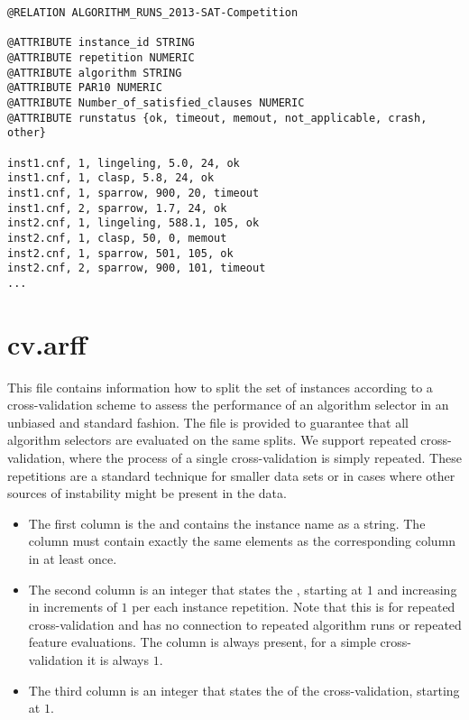 \begin{lstlisting}[caption=Example algorithm\_runs.arff with four algorithms]
@RELATION ALGORITHM_RUNS_2013-SAT-Competition

@ATTRIBUTE instance_id STRING
@ATTRIBUTE repetition NUMERIC
@ATTRIBUTE algorithm STRING
@ATTRIBUTE PAR10 NUMERIC
@ATTRIBUTE Number_of_satisfied_clauses NUMERIC
@ATTRIBUTE runstatus {ok, timeout, memout, not_applicable, crash, other}

inst1.cnf, 1, lingeling, 5.0, 24, ok
inst1.cnf, 1, clasp, 5.8, 24, ok
inst1.cnf, 1, sparrow, 900, 20, timeout
inst1.cnf, 2, sparrow, 1.7, 24, ok
inst2.cnf, 1, lingeling, 588.1, 105, ok
inst2.cnf, 1, clasp, 50, 0, memout
inst2.cnf, 1, sparrow, 501, 105, ok
inst2.cnf, 2, sparrow, 900, 101, timeout
...
\end{lstlisting}


\section{cv.arff}

This file contains information how to split the set of instances according to a cross-validation
scheme to assess the performance of an algorithm selector in an unbiased and standard fashion.
The file is provided to guarantee that all algorithm selectors are evaluated on the same splits.
We support repeated cross-validation, where the process of a single cross-validation is simply 
repeated. These repetitions are a standard technique for smaller data sets or in cases 
where other sources of instability might be present in the data.

\begin{itemize}
  \item The first column is the  and contains the instance name as a string. 
  		The column must contain exactly the same elements as the corresponding column in
 		 at least once.
  \item The second column is an integer that states the , starting at $1$ and increasing 
		in increments of $1$ per each instance repetition. Note that this is for repeated 
                cross-validation and has no connection to repeated algorithm runs or repeated feature
                evaluations. The column is always present, for a simple cross-validation it is always $1$.
  \item The third column is an integer that states the  of the cross-validation, starting at $1$.
\end{itemize}

